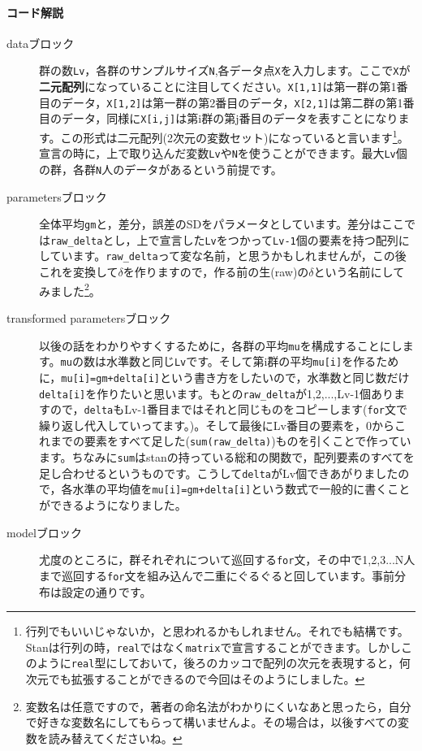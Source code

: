 \documentclass{ltjsbook}
\begin{document}
\paragraph{コード解説}
\begin{description}
  \item[dataブロック] 群の数\verb|Lv|，各群のサンプルサイズ\verb|N|,各データ点\verb|X|を入力します。ここで\verb|X|が\textbf{二元配列}になっていることに注目してください。\verb|X[1,1]|は第一群の第1番目のデータ，\verb|X[1,2]|は第一群の第2番目のデータ，\verb|X[2,1]|は第二群の第1番目のデータ，同様に\verb|X[i,j]|は第i群の第j番目のデータを表すことになります。この形式は二元配列(2次元の変数セット)になっていると言います\footnote{行列でもいいじゃないか，と思われるかもしれません。それでも結構です。Stanは行列の時，\verb|real|ではなく\verb|matrix|で宣言することができます。しかしこのように\verb|real|型にしておいて，後ろのカッコで配列の次元を表現すると，何次元でも拡張することができるので今回はそのようにしました。}。宣言の時に，上で取り込んだ変数\verb|Lv|や\verb|N|を使うことができます。最大\verb|Lv|個の群，各群\verb|N|人のデータがあるという前提です。
  \item[parametersブロック] 全体平均\verb|gm|と，差分，誤差のSDをパラメータとしています。差分はここでは\verb|raw_delta|とし，上で宣言した\verb|Lv|をつかって\verb|Lv-1|個の要素を持つ配列にしています。\verb|raw_delta|って変な名前，と思うかもしれませんが，この後これを変換して$\delta$を作りますので，作る前の生(raw)の$\delta$という名前にしてみました\footnote{変数名は任意ですので，著者の命名法がわかりにくいなあと思ったら，自分で好きな変数名にしてもらって構いませんよ。その場合は，以後すべての変数を読み替えてくださいね。}。
  \item[transformed parametersブロック] 以後の話をわかりやすくするために，各群の平均\verb|mu|を構成することにします。\verb|mu|の数は水準数と同じ\verb|Lv|です。そして第i群の平均\verb|mu[i]|を作るために，\verb|mu[i]=gm+delta[i]|という書き方をしたいので，水準数と同じ数だけ\verb|delta[i]|を作りたいと思います。もとの\verb|raw_delta|が1,2,...,Lv-1個ありますので，\verb|delta|もLv-1番目まではそれと同じものをコピーします(\verb|for|文で繰り返し代入していってます。)。そして最後にLv番目の要素を，0からこれまでの要素をすべて足した(\verb|sum(raw_delta)|)ものを引くことで作っています。ちなみに\verb|sum|はstanの持っている総和の関数で，配列要素のすべてを足し合わせるというものです。こうして\verb|delta|がLv個できあがりましたので，各水準の平均値を\verb|mu[i]=gm+delta[i]|という数式で一般的に書くことができるようになりました。
  \item[modelブロック] 尤度のところに，群それぞれについて巡回する\verb|for|文，その中で1,2,3...N人まで巡回する\verb|for|文を組み込んで二重にぐるぐると回しています。事前分布は設定の通りです。
\end{description}
\end{document}
